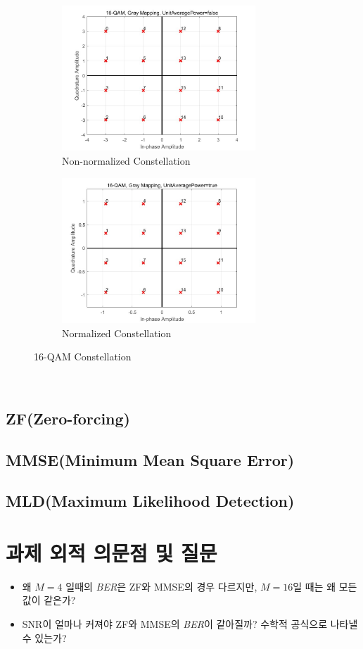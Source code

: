 \documentclass{article}
\begin{document}
\begin{figure}[!ht]
	\centering
	\begin{subfigure}{0.5\textwidth}
		\centerline{\includegraphics[width=0.8\textwidth]{16qamnonunit.jpg}}
		\caption{Non-normalized Constellation}
	\end{subfigure}%
	\begin{subfigure}{0.5\textwidth}
		\centerline{\includegraphics[width=0.8\textwidth]{16qamunit.jpg}}
		\caption{Normalized Constellation}
	\end{subfigure}
	\caption{16-QAM Constellation}
\end{figure}
\\
\subsection{ZF(Zero-forcing)}
\subsection{MMSE(Minimum Mean Square Error)}
\subsection{MLD(Maximum Likelihood Detection)}
\section{과제 외적 의문점 및 질문}
\begin{itemize}
  \item 왜 $M=4$ 일때의 \textsl{BER}은 ZF와 MMSE의 경우 다르지만, $M=16$일 때는 왜 모든 값이 같은가?
  \item SNR이 얼마나 커져야 ZF와 MMSE의 \textsl{BER}이 같아질까? 수학적 공식으로 나타낼 수 있는가?
\end{itemize}
\end{document}
